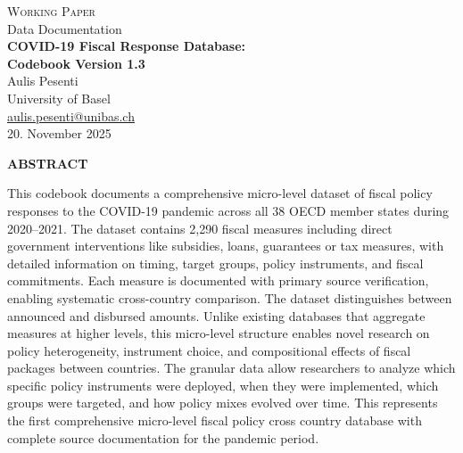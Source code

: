 \documentclass[12pt]{article}
\begin{document}
\begin{titlepage}
\begin{center}

\vspace*{0.5cm}
{\large \textsc{Working Paper}}\\[0.5cm]
{\large Data Documentation}\\[1.5cm]

{\LARGE \textbf{COVID-19 Fiscal Response Database:\\[0.3cm]
Codebook Version 1.3}}\\[2cm]

{\large 
Aulis Pesenti\\[0.2cm]
University of Basel\\[0.2cm]
\href{mailto:email@unibas.ch}{aulis.pesenti@unibas.ch}
}\\[2cm]

{\large 20. November 2025}\\[3cm]

\begin{minipage}{0.85\textwidth}
\begin{center}
\textbf{ABSTRACT}
\end{center}
\vspace{0.3cm}

This codebook documents a comprehensive micro-level dataset of fiscal policy responses to the COVID-19 pandemic across all 38 OECD member states during 2020–2021. The dataset contains 2,290 fiscal measures including direct government interventions like subsidies, loans, guarantees or tax measures, with detailed information on timing, target groups, policy instruments, and fiscal commitments. Each measure is documented with primary source verification, enabling systematic cross-country comparison. The dataset distinguishes between announced and disbursed amounts. Unlike existing databases that aggregate measures at higher levels, this micro-level structure enables novel research on policy heterogeneity, instrument choice, and compositional effects of fiscal packages between countries. The granular data allow researchers to analyze which specific policy instruments were deployed, when they were implemented, which groups were targeted, and how policy mixes evolved over time. This represents the first comprehensive micro-level fiscal policy cross country database with complete source documentation for the pandemic period.



\end{minipage}
\end{center}
\end{titlepage}
\end{document}
